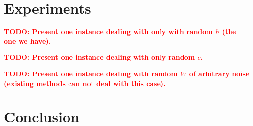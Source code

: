 \documentclass{article}
\theoremstyle{plain}
\theoremstyle{definition}
\theoremstyle{remark}
\begin{document}
\section{Experiments}
\label{sec:experiments}
\textcolor{red}{\textbf{TODO: Present one instance dealing with only with random $h$ (the one we have).}}

\textcolor{red}{\textbf{TODO: Present one instance dealing with only random $c$.}}

\textcolor{red}{\textbf{TODO: Present one instance dealing with random $W$ of arbitrary noise (existing methods can not deal with this case).}}

\section{Conclusion}
\label{sec:conclusion}
\end{document}
